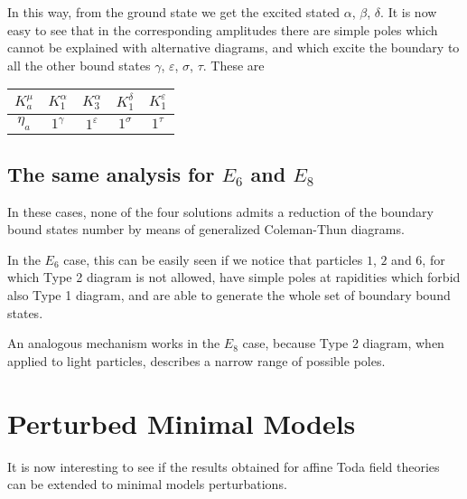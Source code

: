 \documentclass[a4paper,12pt]{report}
\begin{document}
\vspace{0.5cm}

In this way, from the ground state we get the excited stated $\alpha$, $\beta$, $\delta$. It is now easy to see
that in the corresponding amplitudes there are simple poles which cannot be explained with alternative diagrams,
and which excite the boundary to all the other bound states $\gamma$, $\varepsilon$, $\sigma$, $\tau$. These are

\begin{center}
\begin{tabular}{|c|c|c|c|c|}\hline
 $K_{a}^{\mu}$ & $K_{1}^{\alpha}$ & $K_{3}^{\alpha}$  & $K_{1}^{\delta}$ & $K_{1}^{\varepsilon}$\\ \hline
 $\eta_{a}$    & $1^{\gamma}$     & $1^{\varepsilon}$ & $1^{\sigma}$     & $1^{\tau}$\\ \hline

\end{tabular}
\end{center}

\vspace{0.5cm}

\subsection{The same analysis for $E_{6}$ and $E_{8}$}

In these cases, none of the four solutions admits a reduction of the boundary bound states number by means of
generalized Coleman-Thun diagrams.

In the $E_{6}$ case, this can be easily seen if we notice that particles $1$, $2$ and $6$, for which Type 2
diagram is not allowed, have simple poles at rapidities which forbid also Type 1 diagram, and are able to generate
the whole set of boundary bound states.

An analogous mechanism works in the $E_{8}$ case, because Type 2 diagram, when applied to light particles,
describes a narrow range of possible poles.

\vspace{1cm}


\section{Perturbed Minimal Models}

It is now interesting to see if the results obtained for affine Toda field theories can be extended to minimal
models perturbations.
\end{document}
